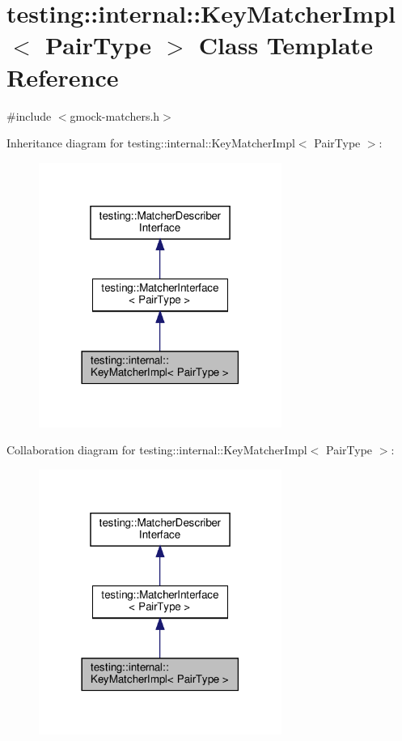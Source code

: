 \hypertarget{classtesting_1_1internal_1_1_key_matcher_impl}{}\section{testing\+:\+:internal\+:\+:Key\+Matcher\+Impl$<$ Pair\+Type $>$ Class Template Reference}
\label{classtesting_1_1internal_1_1_key_matcher_impl}


{\ttfamily \#include $<$gmock-\/matchers.\+h$>$}



Inheritance diagram for testing\+:\+:internal\+:\+:Key\+Matcher\+Impl$<$ Pair\+Type $>$\+:
\nopagebreak
\begin{figure}[H]
\begin{center}
\leavevmode
\includegraphics[width=225pt]{classtesting_1_1internal_1_1_key_matcher_impl__inherit__graph}
\end{center}
\end{figure}


Collaboration diagram for testing\+:\+:internal\+:\+:Key\+Matcher\+Impl$<$ Pair\+Type $>$\+:
\nopagebreak
\begin{figure}[H]
\begin{center}
\leavevmode
\includegraphics[width=225pt]{classtesting_1_1internal_1_1_key_matcher_impl__coll__graph}
\end{center}
\end{figure}
